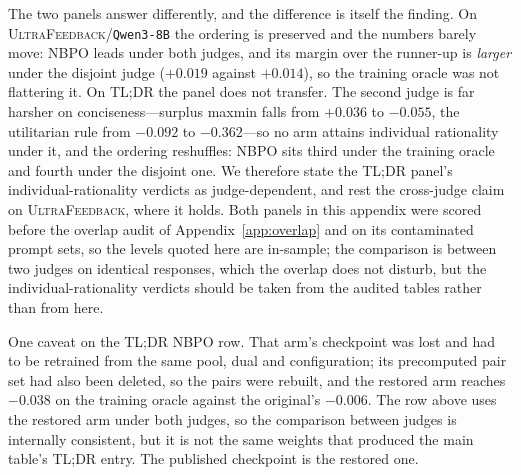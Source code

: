 \documentclass{article}
\theoremstyle{remark}
\theoremstyle{plain}
\newcommand{\NBPO}{\textsc{NBPO}}
\begin{document}
The two panels answer differently, and the difference is itself the finding. On
\textsc{UltraFeedback}/\texttt{Qwen3-8B} the ordering is preserved and the numbers barely move: \NBPO{}
leads under both judges, and its margin over the runner-up is \emph{larger} under the disjoint judge
($+0.019$ against $+0.014$), so the training oracle was not flattering it. On \textsc{TL;DR} the panel
does not transfer. The second judge is far harsher on conciseness---surplus maxmin falls from $+0.036$ to
$-0.055$, the utilitarian rule from $-0.092$ to $-0.362$---so no arm attains individual rationality under
it, and the ordering reshuffles: \NBPO{} sits third under the training oracle and fourth under the
disjoint one. We therefore state the \textsc{TL;DR} panel's individual-rationality verdicts as
judge-dependent, and rest the cross-judge claim on \textsc{UltraFeedback}, where it holds. Both panels in
this appendix were scored before the overlap audit of Appendix~\ref{app:overlap} and on its contaminated
prompt sets, so the levels quoted here are in-sample; the comparison is between two judges on identical
responses, which the overlap does not disturb, but the individual-rationality verdicts should be taken
from the audited tables rather than from here.

One caveat on the \textsc{TL;DR} \NBPO{} row. That arm's checkpoint was lost and had to be retrained from
the same pool, dual and configuration; its precomputed pair set had also been deleted, so the pairs were
rebuilt, and the restored arm reaches $-0.038$ on the training oracle against the original's $-0.006$. The
row above uses the restored arm under both judges, so the comparison between judges is internally
consistent, but it is not the same weights that produced the main table's \textsc{TL;DR} entry. The
published checkpoint is the restored one.
\end{document}
